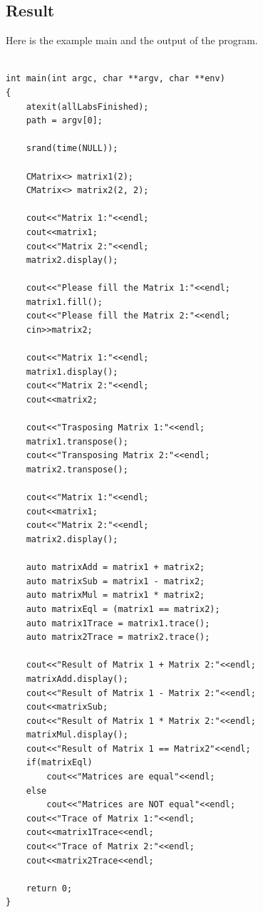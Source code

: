 \documentclass{article}
\begin{document}
	\subsection{Result}
	Here is the example main and the output of the program.
	\begin{lstlisting}[label=CMatrixMain, caption=Example Main]
	
int main(int argc, char **argv, char **env)
{
    atexit(allLabsFinished);
    path = argv[0];

    srand(time(NULL));

    CMatrix<> matrix1(2);
    CMatrix<> matrix2(2, 2);

    cout<<"Matrix 1:"<<endl;
    cout<<matrix1;
    cout<<"Matrix 2:"<<endl;
    matrix2.display();

    cout<<"Please fill the Matrix 1:"<<endl;
    matrix1.fill();
    cout<<"Please fill the Matrix 2:"<<endl;
    cin>>matrix2;

    cout<<"Matrix 1:"<<endl;
    matrix1.display();
    cout<<"Matrix 2:"<<endl;
    cout<<matrix2;

    cout<<"Trasposing Matrix 1:"<<endl;
    matrix1.transpose();
    cout<<"Transposing Matrix 2:"<<endl;
    matrix2.transpose();

    cout<<"Matrix 1:"<<endl;
    cout<<matrix1;
    cout<<"Matrix 2:"<<endl;
    matrix2.display();

    auto matrixAdd = matrix1 + matrix2;
    auto matrixSub = matrix1 - matrix2;
    auto matrixMul = matrix1 * matrix2;
    auto matrixEql = (matrix1 == matrix2);
    auto matrix1Trace = matrix1.trace();
    auto matrix2Trace = matrix2.trace();

    cout<<"Result of Matrix 1 + Matrix 2:"<<endl;
    matrixAdd.display();
    cout<<"Result of Matrix 1 - Matrix 2:"<<endl;
    cout<<matrixSub;
    cout<<"Result of Matrix 1 * Matrix 2:"<<endl;
    matrixMul.display();
    cout<<"Result of Matrix 1 == Matrix2"<<endl;
    if(matrixEql)
        cout<<"Matrices are equal"<<endl;
    else
        cout<<"Matrices are NOT equal"<<endl;
    cout<<"Trace of Matrix 1:"<<endl;
    cout<<matrix1Trace<<endl;
    cout<<"Trace of Matrix 2:"<<endl;
    cout<<matrix2Trace<<endl;

    return 0;
}
	\end{lstlisting}
	
\end{document}
